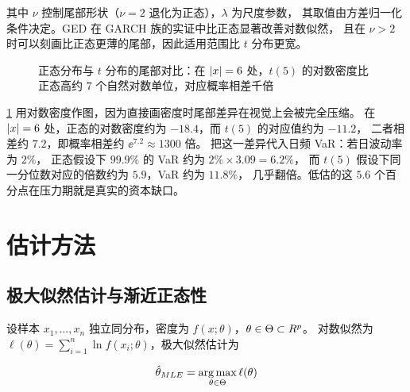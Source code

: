 其中 $\nu$ 控制尾部形状（$\nu = 2$ 退化为正态），$\lambda$ 为尺度参数，
其取值由方差归一化条件决定。GED 在 GARCH 族的实证中比正态显著改善对数似然，
且在 $\nu > 2$ 时可以刻画比正态更薄的尾部，因此适用范围比 $t$ 分布更宽。

\begin{figure}[htbp]
\centering
{}
\caption{正态分布与 $t$ 分布的尾部对比：在 $\left\lvert x \right\rvert = 6$ 处，$t(5)$ 的对数密度比正态高约 $7$ 个自然对数单位，对应概率相差千倍}\label{fig:08-tails}
\end{figure}

\cref{fig:08-tails} 用对数密度作图，因为直接画密度时尾部差异在视觉上会被完全压缩。
在 $\left\lvert x \right\rvert = 6$ 处，正态的对数密度约为 $-18.4$，而 $t(5)$ 的对应值约为 $-11.2$，
二者相差约 $7.2$，即概率相差约 $\ee^{7.2} \approx 1300$ 倍。
把这一差异代入日频 VaR：若日波动率为 $2\%$，
正态假设下 $99.9\%$ 的 VaR 约为 $2\% \times 3.09 = 6.2\%$，
而 $t(5)$ 假设下同一分位数对应的倍数约为 $5.9$，VaR 约为 $11.8\%$，
几乎翻倍。低估的这 $5.6$ 个百分点在压力期就是真实的资本缺口。

\section{估计方法}

\subsection{极大似然估计与渐近正态性}

设样本 $x_1,\dots,x_n$ 独立同分布，密度为 $f(x;\theta)$，$\theta \in \Theta \subset R^{p}$。
对数似然为 $\ell(\theta) = \sum_{i=1}^{n} \ln f(x_i;\theta)$，极大似然估计为

\begin{equation}
  \hat{\theta}_{MLE} = \operatorname*{arg\,max}_{\theta \in \Theta} \ell(\theta)
  \label{eq:08-mle}
\end{equation}

